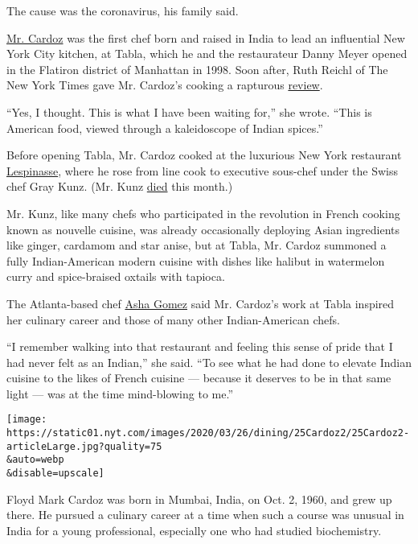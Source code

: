 The cause was the coronavirus, his family said.

\href{https://www.youtube.com/watch?v=9l2vGEQHT1M}{Mr. Cardoz} was the
first chef born and raised in India to lead an influential New York City
kitchen, at Tabla, which he and the restaurateur Danny Meyer opened in
the Flatiron district of Manhattan in 1998. Soon after, Ruth Reichl of
The New York Times gave Mr. Cardoz's cooking a rapturous
\href{https://www.nytimes.com/1999/02/24/dining/restaurants-american-food-indian-spices.html}{review}.

``Yes, I thought. This is what I have been waiting for,'' she wrote.
``This is American food, viewed through a kaleidoscope of Indian
spices.''

Before opening Tabla, Mr. Cardoz cooked at the luxurious New York
restaurant
\href{https://www.nytimes.com/2003/04/11/nyregion/a-gilded-age-of-sumptuous-dining-comes-to-a-close-in-the-st-regis-hotel.html}{Lespinasse},
where he rose from line cook to executive sous-chef under the Swiss chef
Gray Kunz. (Mr. Kunz
\href{https://www.nytimes.com/2020/03/06/obituaries/gray-kunz-dead.html?searchResultPosition=1}{died}
this month.)

Mr. Kunz, like many chefs who participated in the revolution in French
cooking known as nouvelle cuisine, was already occasionally deploying
Asian ingredients like ginger, cardamom and star anise, but at Tabla,
Mr. Cardoz summoned a fully Indian-American modern cuisine with dishes
like halibut in watermelon curry and spice-braised oxtails with tapioca.

The Atlanta-based chef
\href{https://www.nytimes.com/2017/06/06/dining/chef-asha-gomez-india.html}{Asha
Gomez} said Mr. Cardoz's work at Tabla inspired her culinary career and
those of many other Indian-American chefs.

``I remember walking into that restaurant and feeling this sense of
pride that I had never felt as an Indian,'' she said. ``To see what he
had done to elevate Indian cuisine to the likes of French cuisine ---
because it deserves to be in that same light --- was at the time
mind-blowing to me.''

\texttt{[image: https://static01.nyt.com/images/2020/03/26/dining/25Cardoz2/25Cardoz2-articleLarge.jpg?quality=75\\\&auto=webp\\\&disable=upscale]}

Floyd Mark Cardoz was born in Mumbai, India, on Oct. 2, 1960, and grew
up there. He pursued a culinary career at a time when such a course was
unusual in India for a young professional, especially one who had
studied biochemistry.

